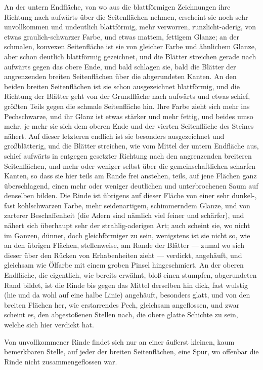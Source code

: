 \documentclass[a4paper, 11pt, oneside, german]{article}
\begin{document}
An der untern Endfläche, von wo aus die blattförmigen Zeichnungen ihre Richtung nach aufwärts über die Seitenflächen nehmen, erscheint sie noch sehr unvollkommen und undeutlich blattförmig, mehr verworren, runzlicht-aderig, von etwas graulich-schwarzer Farbe, und etwas mattem, fettigem Glanze; an der schmalen, konvexen Seitenfläche ist sie von gleicher Farbe und ähnlichem Glanze, aber schon deutlich blattförmig gezeichnet, und die Blätter streichen gerade nach aufwärts gegen das obere Ende, und bald schlagen sie, bald die Blätter der angrenzenden breiten Seitenflächen über die abgerundeten Kanten. An den beiden breiten Seitenflächen ist sie schon ausgezeichnet blattförmig, und die Richtung der Blätter geht von der Grundfläche nach aufwärts und etwas schief, größten Teils gegen die schmale Seitenfläche hin. Ihre Farbe zieht sich mehr ins Pechschwarze, und ihr Glanz ist etwas stärker und mehr fettig, und beides umso mehr, je mehr sie sich dem oberen Ende und der vierten Seitenfläche des Steines nähert. Auf dieser letzteren endlich ist sie besonders ausgezeichnet und großblätterig, und die Blätter streichen, wie vom Mittel der untern Endfläche aus, schief aufwärts in entgegen gesetzter Richtung nach den angrenzenden breiteren Seitenflächen, und mehr oder weniger selbst über die gemeinschaftlichen scharfen Kanten, so dass sie hier teils am Rande frei anstehen, teils, auf jene Flächen ganz überschlagend, einen mehr oder weniger deutlichen und unterbrochenen Saum auf denselben bilden. Die Rinde ist übrigens auf dieser Fläche von einer sehr dunkel-, fast kohlschwarzen Farbe, mehr seidenartigem, schimmerndem Glanze, und von zarterer Beschaffenheit (die Adern sind nämlich viel feiner und schärfer), und nähert sich überhaupt sehr der strahlig-aderigen Art; auch scheint sie, wo nicht im Ganzen, dünner, doch gleichförmiger zu sein, wenigstens ist sie nicht so, wie an den übrigen Flächen, stellenweise, am Rande der Blätter --- zumal wo sich dieser über den Rücken von Erhabenheiten zieht --- verdickt, angehäuft, und gleichsam wie Ölfarbe mit einem groben Pinsel hingeschmiert. An der oberen Endfläche, die eigentlich, wie bereits erwähnt, bloß einen stumpfen, abgerundeten Rand bildet, ist die Rinde bis gegen das Mittel derselben hin dick, fast wulstig (hie und da wohl auf eine halbe Linie) angehäuft, besonders glatt, und von den breiten Flächen her, wie erstarrendes Pech, gleichsam angeflossen, und zwar scheint es, den abgestoßenen Stellen nach, die obere glatte Schichte zu sein, welche sich hier verdickt hat.

Von unvollkommener Rinde findet sich nur an einer äußerst kleinen, kaum bemerkbaren Stelle, auf jeder der breiten Seitenflächen, eine Spur, wo offenbar die Rinde nicht zusammengeflossen war.
\end{document}
